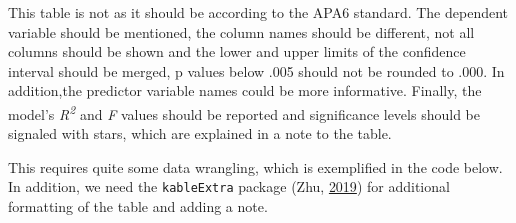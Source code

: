 \documentclass[doc,floatsintext]{apa6}
\begin{document}
\begin{table}

\caption{\label{tab:unnamed-chunk-4}Unedited statistical results of the interaction model 
                 extracted with tidy() and shown with kable().}
\centering
{}
\end{table}

This table is not as it should be according to the APA6 standard. The
dependent variable should be mentioned, the column names should be
different, not all columns should be shown and the lower and upper
limits of the confidence interval should be merged, p values below .005
should not be rounded to .000. In addition,the predictor variable names
could be more informative. Finally, the model's
\emph{R\textsuperscript{2}} and \emph{F} values should be reported and
significance levels should be signaled with stars, which are explained
in a note to the table.

This requires quite some data wrangling, which is exemplified in the
code below. In addition, we need the \texttt{kableExtra} package (Zhu,
\protect\hyperlink{ref-R-kableExtra}{2019}) for additional formatting of
the table and adding a note.
\end{document}
